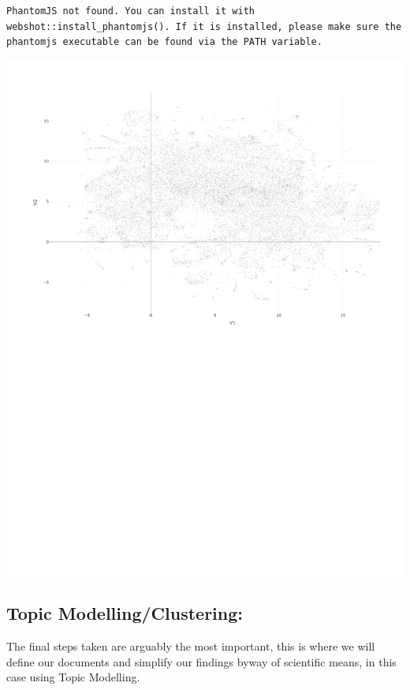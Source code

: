 \documentclass[
  letterpaper,
  DIV=11,
  numbers=noendperiod]{scrreprt}
\begin{document}
\begin{verbatim}
PhantomJS not found. You can install it with webshot::install_phantomjs(). If it is installed, please make sure the phantomjs executable can be found via the PATH variable.
\end{verbatim}

\includegraphics{quarto_docs/conversation_landscape_files/figure-pdf/unnamed-chunk-3-1.pdf}

\subsection{Topic
Modelling/Clustering:}\label{topic-modellingclustering}

The final steps taken are arguably the most important, this is where we
will define our documents and simplify our findings byway of scientific
means, in this case using Topic Modelling.
\end{document}
